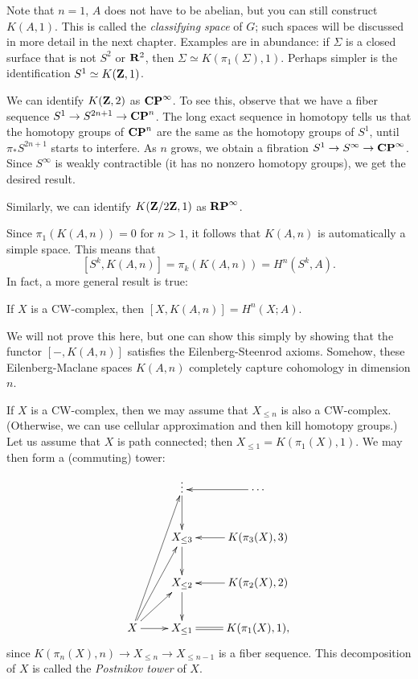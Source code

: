Note that $n=1$, $A$ does not have to be abelian, but you can still construct $K(A,1)$.
This is called the \emph{classifying space} of $G$; such spaces will be discussed in more detail in the next chapter.
Examples are in abundance: if $\Sigma$ is a closed surface that is not $S^2$ or $\mathbf R^2$, then $\Sigma \simeq K(\pi_1(\Sigma),1)$. 
Perhaps simpler is the identification $S^1\simeq K(\mathbf Z,1)$.

\begin{example}
    We can identify $K(\mathbf Z,2)$ as $\mathbf{CP}^\infty$.
    To see this, observe that we have a fiber sequence $S^1\to S^{2n+1}\to \mathbf{CP}^n$.
    The long exact sequence in homotopy tells us that the homotopy groups of $\mathbf{CP}^n$ are the same as the homotopy groups of $S^1$,
    until $\pi_\ast S^{2n+1}$ starts to interfere.
    As $n$ grows, we obtain a fibration $S^1\to S^\infty\to \mathbf{CP}^\infty$.
    Since $S^\infty$ is weakly contractible (it has no nonzero homotopy groups), we get the desired result.
\end{example}
\begin{example}
    Similarly, we can identify $K(\mathbf Z/2\mathbf Z,1)$ as $\mathbf{RP}^\infty$.
\end{example}

Since $\pi_1(K(A,n)) = 0$ for $n>1$, it follows that $K(A,n)$ is automatically a simple space.
This means that
$$[S^k,K(A,n)] = \pi_k(K(A,n)) = H^n(S^k,A).$$
In fact, a more general result is true:
\begin{theorem}
    If $X$ is a CW-complex, then $[X,K(A,n)] = H^n(X;A)$. 
\end{theorem}
We will not prove this here, but one can show this simply by showing that the functor $[-,K(A,n)]$ satisfies
the Eilenberg-Steenrod axioms.
Somehow, these Eilenberg-Maclane spaces $K(A,n)$ completely capture cohomology in dimension $n$. 

If $X$ is a CW-complex, then we may assume that $X_{\leq n}$ is also a CW-complex.
(Otherwise, we can use cellular approximation and then kill homotopy groups.)
Let us assume that $X$ is path connected; then $X_{\leq 1} = K(\pi_1(X),1)$.
We may then form a (commuting) tower:
\begin{equation*}
    \xymatrix{
	& \vdots\ar[d] & \cdots\ar[l]\\
	& X_{\leq 3}\ar[d]& K(\pi_3(X),3)\ar[l]\\
	& X_{\leq 2}\ar[d]& K(\pi_2(X),2)\ar[l]\\
	X\ar[r]\ar[ur]\ar[uur]\ar[uuur]& X_{\leq 1}\ar@{=}[r] & K(\pi_1(X),1),
    }
\end{equation*}
since $K(\pi_n(X),n)\to X_{\leq n}\to X_{\leq n-1}$ is a fiber sequence.
This decomposition of $X$ is called the \emph{Postnikov tower} of $X$.

